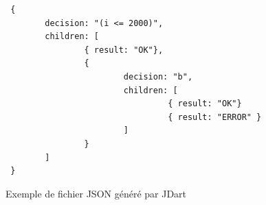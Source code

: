 \begin{figure}[H]
 \centering
 \begin{verbatim}
 {
        decision: "(i <= 2000)",
        children: [
                { result: "OK"},
                { 
                        decision: "b",
                        children: [
                                 { result: "OK"}
                                 { result: "ERROR" }
                        ]
                }
        ]
 }
 \end{verbatim}
 \caption{Exemple de fichier JSON généré par JDart}
\end{figure}

